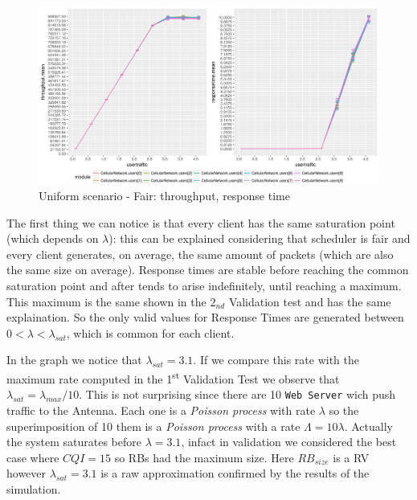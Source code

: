 \begin{figure}[H]
  \includegraphics[width=1\textwidth]{images/all-unif}
  \caption{Uniform scenario - Fair: throughput, response time}
  \label{fig:Uniform scenario - Fair: throughput, response time}
\end{figure}
The first thing we can notice is that every client has the same saturation point (which depends on \(\lambda\)): this can be explained considering that scheduler is fair and every client generates, on average, the same amount of packets (which are also the same size on average). Response times are stable before reaching the common saturation point and after tends to arise indefinitely, until reaching a maximum. This maximum is the same shown in the \(2_{nd}\) Validation test and has the same explaination. So the only valid values for Response Times are generated between \(0 < \lambda < \lambda_{sat}\), which is common for each client. 

In the graph we notice that \(\lambda_{sat}=3.1\). If we compare this rate with the maximum rate computed in the 1\textsuperscript{st} Validation Test we observe that \(\lambda_{sat} = \lambda_{max}/10\). This is not surprising since there are 10 \texttt{Web Server} wich push traffic to the Antenna. Each one is a \textit{Poisson process} with rate \(\lambda\) so the superimposition of 10 them is a \textit{Poisson process} with a rate \(\Lambda = 10\lambda\). Actually the system saturates before \(\lambda=3.1\), infact in validation we considered the best case where \(CQI=15\) so RBs had the maximum size. Here \(RB_{size}\) is a RV however \(\lambda_{sat}=3.1\) is a raw approximation confirmed by the results of the simulation.

